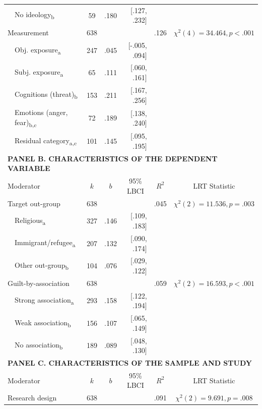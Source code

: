 \begin{ThreePartTable}
\begin{longtable}[c]{llcrrcc}
 & No ideology\textsubscript{b} & 59 & .180 & [.127, .232] &  &  \\
\multicolumn{2}{l}{Measurement} & 638 &  &  & .126 & $\chi^2(4)= 34.464, p<.001$ \\
 & Obj. exposure\textsubscript{a} & 247 & .045 & [-.005, .094] &  &  \\
 & Subj. exposure\textsubscript{a} & 65 & .111 & [.060, .161] &  &  \\
 & Cognitions (threat)\textsubscript{b} & 153 & .211 & [.167, .256] &  &  \\
 & Emotions (anger, fear)\textsubscript{b,c} & 72 & .189 & [.138, .240] &  &  \\
 & Residual category\textsubscript{a,c} & 101 & .145 & [.095, .195] &  &  \\ [1.5ex] \hline
 \multicolumn{7}{l}{\textbf{PANEL B. CHARACTERISTICS OF THE DEPENDENT VARIABLE}} \\ \hline
 \multicolumn{2}{l}{{Moderator}} & \multicolumn{1}{c}{{$k$}} & \multicolumn{1}{c}{{$b$}} & \multicolumn{1}{c}{{95\% LBCI}} & \multicolumn{1}{c}{{$R^2$}} & \multicolumn{1}{c}{{LRT Statistic}} \\ \hline
\multicolumn{2}{l}{Target out-group} & 638 &  &  & .045 & $\chi^2(2)= 11.536, p=.003$ \\
 & Religious\textsubscript{a} & 327 & .146 & [.109, .183] &  &  \\
 & Immigrant/refugee\textsubscript{a} & 207 & .132 & [.090, .174] &  &  \\
 & Other out-group\textsubscript{b} & 104 & .076 & [.029, .122] &  &  \\
\multicolumn{2}{l}{Guilt-by-association} & 638 &  &  & .059 & $\chi^2(2)=16.593, p<.001$ \\
 & Strong association\textsubscript{a} & 293 & .158 & [.122, .194] &  &  \\
 & Weak association\textsubscript{b} & 156 & .107 & [.065, .149] &  &  \\
 & No association\textsubscript{b} & 189 & .089 & [.048, .130] &  & \\ [1.5ex] \hline
 \multicolumn{7}{l}{\textbf{PANEL C. CHARACTERISTICS OF THE SAMPLE AND STUDY}} \\ \hline
 \multicolumn{2}{l}{{Moderator}} & \multicolumn{1}{c}{{$k$}} & \multicolumn{1}{c}{{$b$}} & \multicolumn{1}{c}{{95\% LBCI}} & \multicolumn{1}{c}{{$R^2$}} & \multicolumn{1}{c}{{LRT Statistic}} \\ \hline
\multicolumn{2}{l}{Research design} & 638 &  &  & .091 & $\chi^2(2)=9.691, p=.008$ \\

\end{longtable}
\end{ThreePartTable}
